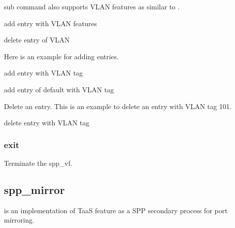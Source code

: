 \documentclass[a4paper,11pt,openany,oneside,english]{sphinxmanual}
\begin{document}
 sub command also supports VLAN features as similar
to .

\begin{sphinxVerbatim}[commandchars=\\\{\},formatcom=\footnotesize]
 add entry with VLAN features

 delete entry of VLAN
\end{sphinxVerbatim}

Here is an example for adding entries.

\begin{sphinxVerbatim}[commandchars=\\\{\},formatcom=\footnotesize]
 add entry with VLAN tag

 add entry of default with VLAN tag
\end{sphinxVerbatim}

Delete an entry. This is an example to delete an entry with VLAN tag 101.

\begin{sphinxVerbatim}[commandchars=\\\{\},formatcom=\footnotesize]
 delete entry with VLAN tag
\end{sphinxVerbatim}


\subsubsection{exit}
\label{\detokenize{commands/secondary/spp_vf:exit}}
Terminate the spp\_vf.

\begin{sphinxVerbatim}[commandchars=\\\{\},formatcom=\footnotesize]
\end{sphinxVerbatim}


\subsection{spp\_mirror}
\label{\detokenize{commands/secondary/spp_mirror:spp-mirror}}\label{\detokenize{commands/secondary/spp_mirror:commands-spp-mirror}}\label{\detokenize{commands/secondary/spp_mirror::doc}}
 is an implementation of TaaS feature as a SPP secondary process
for port mirroring.
\end{document}
